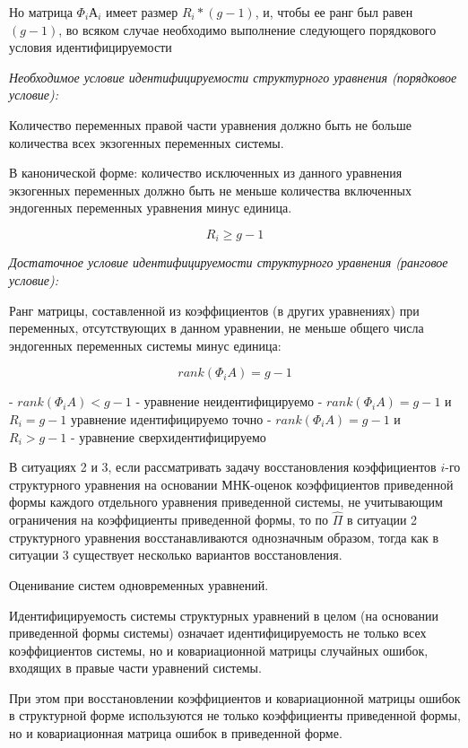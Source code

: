 \documentclass[a4paper,8pt]{article} %
\begin{document}
Но матрица $\Phi_i А_i$    имеет размер $ R_i * (g - 1)$, и, чтобы ее ранг был равен $(g - 1)$, во всяком случае необходимо выполнение следующего порядкового условия идентифицируемости 



\textit{Необходимое условие идентифицируемости структурного уравнения (порядковое условие): }

Количество переменных правой части уравнения должно быть не больше количества всех экзогенных переменных системы. 

В канонической форме: количество исключенных из данного уравнения экзогенных переменных должно быть не меньше количества включенных эндогенных переменных уравнения минус единица. 

$$ R_i \geq g - 1 $$ 

\textit{Достаточное условие идентифицируемости структурного уравнения (ранговое условие):}


Ранг матрицы, составленной из коэффициентов (в других уравнениях) при переменных, отсутствующих в данном уравнении, не меньше общего числа эндогенных переменных системы минус единица:

$$ rank (\Phi_i A )  = g - 1 $$



- $ rank (\Phi_i A )  < g - 1 $ - уравнение неидентифицируемо
- $ rank (\Phi_i A )  = g - 1 $ и $ R_i = g - 1 $  уравнение идентифицируемо точно 
- $ rank (\Phi_i A )  =  g - 1 $  и $ R_i > g - 1 $  - уравнение сверхидентифицируемо


В ситуациях 2 и 3, если рассматривать задачу восстановления коэффициентов $i$-го структурного уравнения на
основании МНК-оценок коэффициентов приведенной формы  каждого отдельного уравнения приведенной системы, не учитывающим ограничения на коэффициенты приведенной формы, то по $\hat{\Pi}$  в ситуации 2  структурного уравнения восстанавливаются  однозначным образом, тогда как в ситуации 3 существует несколько вариантов восстановления.



Оценивание  систем  одновременных  уравнений.  



Идентифицируемость системы структурных уравнений в целом (на основании приведенной формы системы) означает идентифицируемость не только
всех коэффициентов системы, но и ковариационной матрицы случайных
ошибок, входящих в правые части уравнений системы. 

При этом при восстановлении коэффициентов и ковариационной матрицы ошибок в структурной форме используются не только коэффициенты приведенной формы, но и ковариационная матрица ошибок в приведенной форме.
\end{document}
